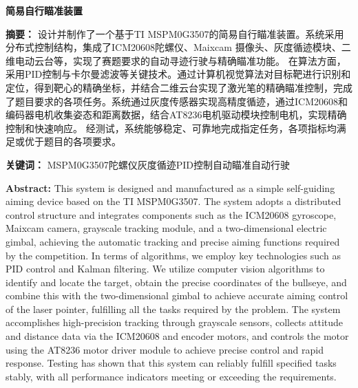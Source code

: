 \documentclass[12pt,a4paper]{ctexart}
\begin{document}
\begin{center}
    {\Large \bfseries 简易自行瞄准装置}
\end{center}

\vspace{1cm}

\noindent
\textbf{摘要：} 设计并制作了一个基于TI MSPM0G3507的简易自行瞄准装置。系统采用分布式控制结构，集成了ICM20608陀螺仪、Maixcam 摄像头、灰度循迹模块、二维电动云台等，实现了赛题要求的自动寻迹行驶与精确瞄准功能。 在算法方面，采用PID控制与卡尔曼滤波等关键技术。通过计算机视觉算法对目标靶进行识别和定位，得到靶心的精确坐标，并结合二维云台实现了激光笔的精确瞄准控制，完成了题目要求的各项任务。系统通过灰度传感器实现高精度循迹，通过ICM20608和编码器电机收集姿态和距离数据，结合AT8236电机驱动模块控制电机，实现精确控制和快速响应。 经测试，系统能够稳定、可靠地完成指定任务，各项指标均满足或优于题目的各项要求。 

\noindent
\textbf{关键词：} MSPM0G3507\hspace{1.5em}陀螺仪\hspace{1.5em}灰度循迹\hspace{1.5em}PID控制\hspace{1.5em}自动瞄准\hspace{1.5em}自动行驶
\vspace{1cm}

\noindent
\textbf{Abstract:} This system is designed and manufactured as a simple self-guiding aiming device based on the TI MSPM0G3507. The system adopts a distributed control structure and integrates components such as the ICM20608 gyroscope, Maixcam camera, grayscale tracking module, and a two-dimensional electric gimbal, achieving the automatic tracking and precise aiming functions required by the competition. In terms of algorithms, we employ key technologies such as PID control and Kalman filtering. We utilize computer vision algorithms to identify and locate the target, obtain the precise coordinates of the bullseye, and combine this with the two-dimensional gimbal to achieve accurate aiming control of the laser pointer, fulfilling all the tasks required by the problem. The system accomplishes high-precision tracking through grayscale sensors, collects attitude and distance data via the ICM20608 and encoder motors, and controls the motor using the AT8236 motor driver module to achieve precise control and rapid response. Testing has shown that this system can reliably fulfill specified tasks stably, with all performance indicators meeting or exceeding the requirements.
\end{document}
